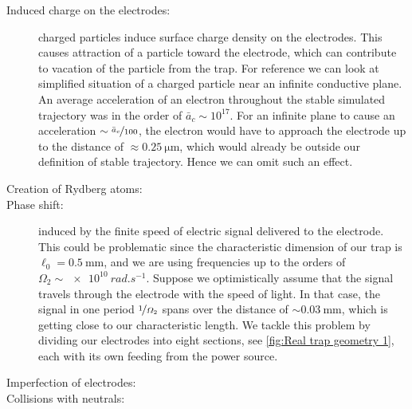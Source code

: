 \begin{description}
	\item[Induced charge on the electrodes:] charged particles induce surface charge density on the electrodes. This causes attraction of a particle toward the electrode, which can contribute to vacation of the particle from the trap. For reference we can look at simplified situation of a charged particle near an infinite conductive plane. An average acceleration of an electron throughout the stable simulated trajectory was in the order of $\bar{a}_c \sim 10^{17}$. For an infinite plane to cause an acceleration $\sim \nicefrac{\bar{a}_c}{100}$, the electron would have to approach the electrode up to the distance of $\approx \SI{0.25}{\micro\meter}$, which would already be outside our definition of stable trajectory. Hence we can omit such an effect. 
	\item[Creation of Rydberg atoms:] 
	\item[Phase shift:] induced by the finite speed of electric signal delivered to the electrode. This could be problematic since the characteristic dimension of our trap is $\ell_0 = \SI{0.5}{\mm}$, and we are using frequencies up to the orders of $\Omega_2 \sim \SI{e10}{rad.s^{-1}}$. Suppose we optimistically assume that the signal travels through the electrode with the speed of light. In that case, the signal in one period $\nicefrac{1}{\Omega_2}$ spans over the distance of $\sim \SI{0.03}{\mm}$, which is getting close to our characteristic length. We tackle this problem by dividing our electrodes into eight sections, see \ref{fig:Real trap geometry 1}, each with its own feeding from the power source.
	\item[Imperfection of electrodes:] 	
	\item[Collisions with neutrals:] 
\end{description}	

